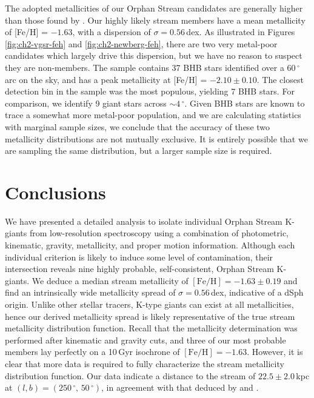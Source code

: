 The adopted metallicities of our Orphan Stream candidates are generally higher than those found by \citet{Newberg_et-al_2010}. Our highly likely stream members have a mean metallicity of [Fe/H] = $-1.63$, with a dispersion of $\sigma = 0.56$\,dex. As illustrated in Figures \ref{fig:ch2-vgsr-feh} and \ref{fig:ch2-newberg-feh}, there are two very metal-poor candidates which largely drive this dispersion, but we have no reason to suspect they are non-members. The \citet{Newberg_et-al_2010} sample contains 37 BHB stars identified over a 60\,$^\circ$ arc on the sky, and has a peak metallicity at [Fe/H] = $-2.10 \pm 0.10$. The closest detection bin in the \citet{Newberg_et-al_2010} sample was the most populous, yielding 7 BHB stars. For comparison, we identify 9 giant stars across $\sim{}4\,^\circ$. Given BHB stars are known to trace a somewhat more metal-poor population, and we are calculating statistics with marginal sample sizes, we conclude that the accuracy of these two metallicity distributions are not mutually exclusive. It is entirely possible that we are sampling the same distribution, but a larger sample size is required.


\section{Conclusions}
\label{sec:ch2-conclusions}

We have presented a detailed analysis to isolate individual Orphan Stream K-giants from low-resolution spectroscopy using a combination of photometric, kinematic, gravity, metallicity, and proper motion information. Although each individual criterion is likely to induce some level of contamination, their intersection reveals nine highly probable, self-consistent, Orphan Stream K-giants.  We deduce a median stream metallicity of $[\mbox{Fe/H}] = -1.63 \pm 0.19$ and find an intrinsically wide metallicity spread of $\sigma = 0.56$\,dex, indicative of a dSph origin. Unlike other stellar tracers, K-type giants can exist at all metallicities, hence our derived metallicity spread is likely representative of the true stream metallicity distribution function. Recall that the metallicity determination was performed after kinematic and gravity cuts, and three of our most probable members lay perfectly on a 10\,Gyr isochrone of $[\mbox{Fe/H}] = -1.63$. However, it is clear that more data is required to fully characterize the stream metallicity distribution function. Our data indicate a distance to the stream of $22.5 \pm 2.0$\,kpc at $(l, b) = (250\,^\circ,\,50\,^\circ)$, in agreement with that deduced by \citet{Grillmair_2006} and \citet{Newberg_et-al_2010}.

